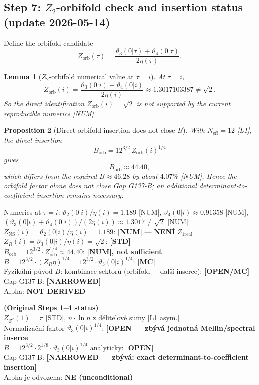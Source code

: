 \documentclass[12pt,a4paper]{article}
\newtheorem{lemma}{Lemma}[section]
\newtheorem{proposition}[lemma]{Proposition}
\begin{document}
\subsection*{Step 7: $Z_2$-orbifold check and insertion status (update 2026-05-14)}

Define the orbifold candidate
\[
Z_{\mathrm{orb}}(\tau)=\frac{\vartheta_3(0|\tau)+\vartheta_4(0|\tau)}{2\eta(\tau)}.
\]

\begin{lemma}[$Z_2$-orbifold numerical value at $\tau=i$]
At $\tau=i$,
\[
Z_{\mathrm{orb}}(i)=\frac{\vartheta_3(0|i)+\vartheta_4(0|i)}{2\eta(i)}
\approx 1.3017103387 \neq \sqrt{2}.
\]
So the direct identification $Z_{\mathrm{orb}}(i)=\sqrt{2}$ is not supported by
the current reproducible numerics \textup{[NUM]}.
\end{lemma}

\begin{proposition}[Direct orbifold insertion does not close $B$]
With $N_{\mathrm{eff}}=12$ [L1], the direct insertion
\[
B_{\mathrm{orb}}=12^{3/2}\,Z_{\mathrm{orb}}(i)^{1/4}
\]
gives
\[
B_{\mathrm{orb}}\approx 44.40,
\]
which differs from the required \(B\approx 46.28\) by about \(4.07\%\) [NUM].
Hence the orbifold factor alone does not close Gap G137-B; an additional
determinant-to-coefficient insertion remains necessary.
\end{proposition}

\begin{statusbox}
Numerics at $\tau=i$: $\vartheta_2(0|i)/\eta(i)=1.189$ [NUM], $\vartheta_4(0|i)\approx0.91358$ [NUM], $(\vartheta_3(0|i)+\vartheta_4(0|i))/(2\eta(i))\approx1.3017\neq\sqrt{2}$ [NUM]\\
$Z_{\mathrm{NS}}(i)=\vartheta_2(0|i)/\eta(i)=1.189$: \textbf{[NUM]} --- \textbf{NENÍ} $Z_{1\mathrm{real}}$\\
$Z_R(i)=\vartheta_3(0|i)/\eta(i)=\sqrt{2}$: \textbf{[STD]}\\
$B_{\mathrm{orb}}=12^{3/2}\cdot Z_{\mathrm{orb}}^{1/4}\approx44.40$: \textbf{[NUM], not sufficient}\\
$B=12^{3/2}\cdot(Z_R\eta)^{1/4}=12^{3/2}\cdot\vartheta_3(0|i)^{1/4}$: \textbf{[MC]}\\
Fyzikální původ $B$: kombinace sektorů (orbifold + další inserce): \textbf{[OPEN/MC]}\\
Gap G137-B: \textbf{[NARROWED]}\\
Alpha: \textbf{NOT DERIVED}
\end{statusbox}

\begin{statusbox}
\textbf{(Original Steps 1--4 status)}\\
$Z_{Z^2}(1) = \pi$ [STD], $n\!\cdot\!\ln n$ z dělitelové sumy [L1 asym.]\\
Normalizační faktor $\vartheta_3(0|i)^{1/4}$: \textbf{[OPEN — zbývá jednotná Mellin/spectral inserce]}\\
$B = 12^{3/2}\cdot2^{1/8}\cdot\vartheta_3(0|i)^{1/4}$ analyticky: \textbf{[OPEN]}\\
Gap G137-B: \textbf{[NARROWED — zbývá: exact determinant-to-coefficient insertion]}\\
Alpha je odvozena: \textbf{NE (unconditional)}
\end{statusbox}
\end{document}
